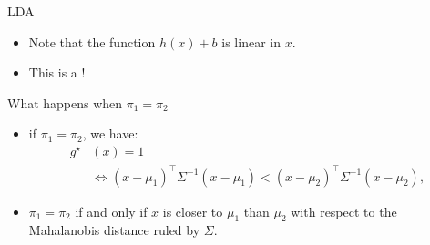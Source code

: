 \documentclass[xcolor={usenames,dvipsnames},handout]{beamer}
\begin{document}
\begin{frame}{LDA}
	
	\begin{itemize}
	\item Note that the function $h(x)+b$ is linear in $x$. 	  	    \item This is a !
	\end{itemize}
	\pause 
	\begin{block}{What happens when $\pi_1 = \pi_2$}
	 \begin{itemize}
	 \item if $\pi_1 = \pi_2$, we have:
		\begin{align*}
			g^\star & (x) = 1 \\
			&\iff
			(x-\mu_1)^\top\Sigma^{-1}(x-\mu_1) < 	(x-\mu_2)^\top\Sigma^{-1}(x-\mu_2),
		\end{align*}
		\pause
		\item $\pi_1 = \pi_2$ if and only if $x$ is closer to $\mu_1$ than $\mu_2$ with respect to the Mahalanobis distance ruled by $\Sigma$. 
		\end{itemize}
	\end{block}
\end{frame}

%
	
\end{document}
